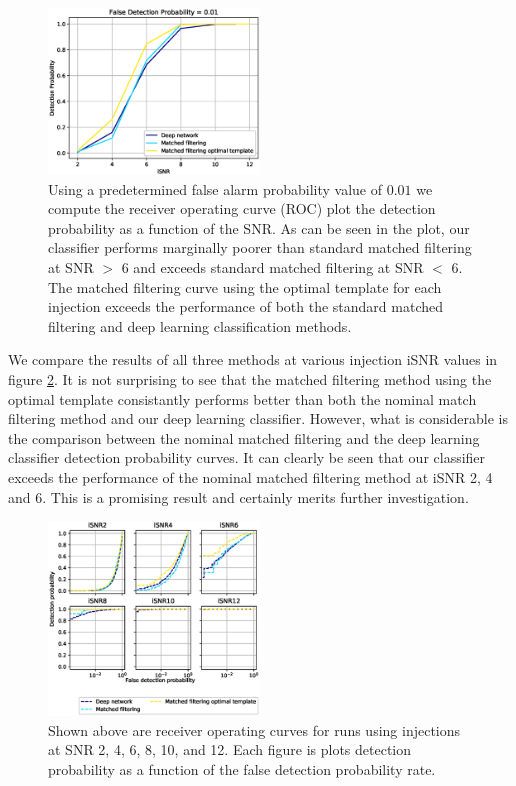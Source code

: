 \documentclass[%
 amsmath,amssymb,
 aps,
 twocolumn,
 prl,
 reprint,
floatfix,
]{revtex4-1}
\begin{document}
\begin{figure}[]
 \includegraphics[width=0.5\textwidth]
 {figures/accuracy.eps}
 \caption{\label{fig:ROC_curve} Using a predetermined false alarm probability value of $0.01$ we compute the receiver operating curve (ROC) plot the detection probability as a function of the SNR. As can be seen in the plot, our classifier performs marginally poorer than standard matched filtering at SNR $>$ 6 and exceeds standard matched filtering at SNR $<$ 6. The matched filtering curve using the optimal template for each injection exceeds the performance of both the standard matched filtering and deep learning classification methods.}
\end{figure}

We compare the results of all three methods at various injection iSNR values in figure \ref{fig:isnr_curves}. It is not surprising to see that the matched filtering method using the optimal template consistantly performs better than both the nominal match filtering method and our deep learning classifier. However, what is considerable is the comparison between the nominal matched filtering and the deep learning classifier detection probability curves. It can clearly be seen that our classifier exceeds the performance of the nominal matched filtering method at iSNR 2, 4 and 6. This is a promising result and certainly merits further investigation.  

\begin{figure}[]
 \includegraphics[width=0.5\textwidth]
 {figures/ROC_curves.eps}
 \caption{\label{fig:isnr_curves} Shown above are receiver operating curves for runs using injections at SNR 2, 4, 6, 8, 10, and 12. Each figure is plots detection probability as a function of the false detection probability rate.}
\end{figure}
\end{document}

